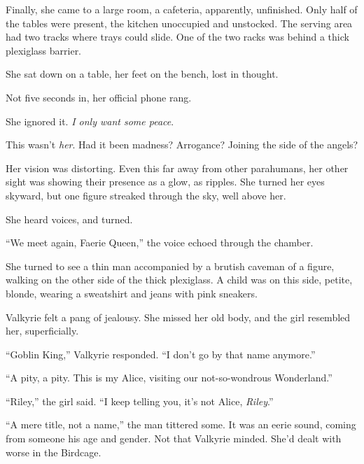 Finally, she came to a large room, a cafeteria, apparently, unfinished.  Only half of the tables were present, the kitchen unoccupied and unstocked.  The serving area had two tracks where trays could slide.  One of the two racks was behind a thick plexiglass barrier.



She sat down on a table, her feet on the bench, lost in thought.



Not five seconds in, her official phone rang.



She ignored it.  \emph{I only want some peace}.



This wasn't \emph{her}.  Had it been madness?  Arrogance?  Joining the side of the angels?



Her vision was distorting.  Even this far away from other parahumans, her other sight was showing their presence as a glow, as ripples.  She turned her eyes skyward, but one figure streaked through the sky, well above her.



She heard voices, and turned.



``We meet again, Faerie Queen,'' the voice echoed through the chamber.



She turned to see a thin man accompanied by a brutish caveman of a figure, walking on the other side of the thick plexiglass.  A child was on this side, petite, blonde, wearing a sweatshirt and jeans with pink sneakers.



Valkyrie felt a pang of jealousy.  She missed her old body, and the girl resembled her, superficially.



``Goblin King,'' Valkyrie responded. ``I don't go by that name anymore.''



``A pity, a pity.  This is my Alice, visiting our not-so-wondrous Wonderland.''



``Riley,'' the girl said.  ``I keep telling you, it's not Alice, \emph{Riley}.''



``A mere title, not a name,'' the man tittered some.  It was an eerie sound, coming from someone his age and gender.  Not that Valkyrie minded.  She'd dealt with worse in the Birdcage.



